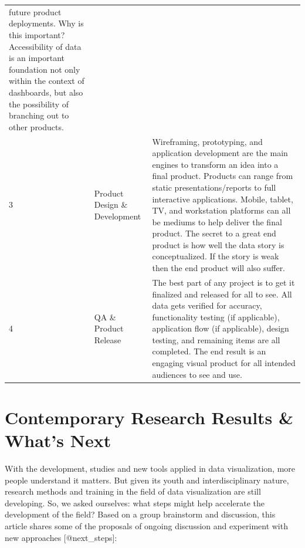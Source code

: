 \documentclass[]{book}
\theoremstyle{definition}
\theoremstyle{definition}
\theoremstyle{definition}
\theoremstyle{remark}
\begin{document}
\begin{longtable}[]{@{}lll@{}}
\begin{minipage}[t]{0.76\columnwidth}
future product deployments. Why is this important? Accessibility of data
is an important foundation not only within the context of dashboards,
but also the possibility of branching out to other products.\strut
\end{minipage}\tabularnewline
\begin{minipage}[t]{0.04\columnwidth}\raggedright\strut
3\strut
\end{minipage} & \begin{minipage}[t]{0.11\columnwidth}\raggedright\strut
Product Design \& Development\strut
\end{minipage} & \begin{minipage}[t]{0.76\columnwidth}\raggedright\strut
Wireframing, prototyping, and application development are the main
engines to transform an idea into a final product. Products can range
from static presentations/reports to full interactive applications.
Mobile, tablet, TV, and workstation platforms can all be mediums to help
deliver the final product. The secret to a great end product is how well
the data story is conceptualized. If the story is weak then the end
product will also suffer.\strut
\end{minipage}\tabularnewline
\begin{minipage}[t]{0.04\columnwidth}\raggedright\strut
4\strut
\end{minipage} & \begin{minipage}[t]{0.11\columnwidth}\raggedright\strut
QA \& Product Release\strut
\end{minipage} & \begin{minipage}[t]{0.76\columnwidth}\raggedright\strut
The best part of any project is to get it finalized and released for all
to see. All data gets verified for accuracy, functionality testing (if
applicable), application flow (if applicable), design testing, and
remaining items are all completed. The end result is an engaging visual
product for all intended audiences to see and use.\strut
\end{minipage}\tabularnewline
\bottomrule
\end{longtable}

\section{Contemporary Research Results \& What's
Next}\label{contemporary-research-results-whats-next}

With the development, studies and new tools applied in data
visualization, more people understand it matters. But given its youth
and interdisciplinary nature, research methods and training in the field
of data visualization are still developing. So, we asked ourselves: what
steps might help accelerate the development of the field? Based on a
group brainstorm and discussion, this article shares some of the
proposals of ongoing discussion and experiment with new approaches
{[}@next\_steps{]}:
\end{document}
